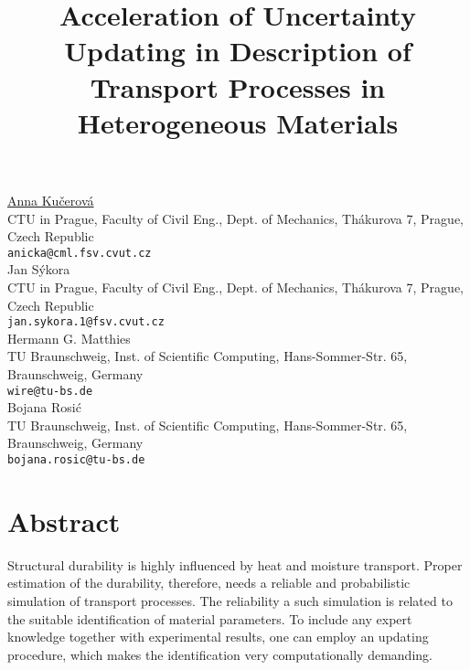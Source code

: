 

\title{
Acceleration of Uncertainty Updating in Description of Transport Processes
in Heterogeneous Materials}
\author{} \institute{} %
\maketitle
\begin{center}
{\large \underline{Anna Ku\v{c}erov\'a}}\\
CTU in Prague, Faculty of Civil Eng., Dept. of Mechanics, Th\'akurova 7, Prague, Czech Republic\\
{\tt anicka@cml.fsv.cvut.cz}\\
\vspace{4mm} %
{\large Jan S\'ykora}\\
CTU in Prague, Faculty of Civil Eng., Dept. of Mechanics, Th\'akurova 7, Prague, Czech Republic\\
{\tt jan.sykora.1@fsv.cvut.cz}\\
\vspace{4mm} %
{\large Hermann G. Matthies}\\
TU Braunschweig, Inst. of Scientific Computing, Hans-Sommer-Str. 65, Braunschweig, Germany\\
{\tt wire@tu-bs.de}\\
\vspace{4mm} %
{\large Bojana Rosi\'c}\\
TU Braunschweig, Inst. of Scientific Computing, Hans-Sommer-Str. 65, Braunschweig, Germany\\
{\tt bojana.rosic@tu-bs.de}
\end{center}

\section*{Abstract}

Structural durability is highly influenced by heat and moisture
transport. Proper estimation of the durability, therefore, needs a
reliable and probabilistic simulation of transport processes.  The
reliability a such simulation is related to the suitable
identification of material parameters. To include any expert knowledge
together with experimental results, one can employ an updating
procedure, which makes the identification very computationally
demanding.

